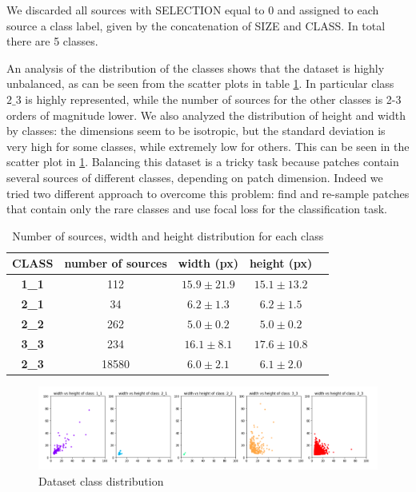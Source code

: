 \documentclass[a4paper,10pt]{report}
\begin{document}
We discarded all sources with SELECTION equal to 0 and assigned to each source a class label, given by the concatenation of SIZE and CLASS. In total there are 5 classes. 

An analysis of the distribution of the classes shows that the dataset is highly unbalanced, as can be seen from the scatter plots in table \ref{table:class_analysis}. In particular class $2\_3$ is highly represented, while the number of sources for the other classes is 2-3 orders of magnitude lower. We also analyzed the distribution of height and width by classes: the dimensions seem to be isotropic, but the standard deviation is very high for some classes, while extremely low for others. This can be seen in the scatter plot in \ref{fig:scatter_class}.
Balancing this dataset is a tricky task because patches contain several sources of different classes, depending on patch dimension. Indeed we tried two different approach to overcome this problem: find and re-sample patches that contain only the rare classes and use focal loss for the classification task.
\begin{table}[h]
  \center
  \begin{tabular}{|c|c|c|c|c|}
    \hline
    \textbf{CLASS}& \textbf{number of sources} & \textbf{width (px)} & \textbf{height (px)} \\ 
    \hline
    \textbf{1_1} & 112 & $15.9\pm21.9$ & $15.1\pm13.2$ \\ 
    \hline
    \textbf{2_1} & 34 & $6.2\pm1.3$ & $6.2\pm1.5$ \\ 
    \hline
    \textbf{2_2} & 262 & $5.0\pm0.2$ & $5.0\pm0.2$ \\ 
    \hline
    \textbf{3_3} & 234 & $16.1\pm8.1$ & $17.6\pm10.8$ \\ 
    \hline
    \textbf{2_3} & 18580 & $6.0\pm2.1$ & $6.1\pm2.0$ \\ 
    \hline
  \end{tabular}
  \caption{Number of sources, width and height distribution for each class}
  \label{table:class_analysis}
\end{table}

\begin{figure}[h]
  \center
  \includegraphics[width=0.85\linewidth]{scatter_class.png}
  \caption{Dataset class distribution}
  \label{fig:scatter_class}
\end{figure}
\end{document}
